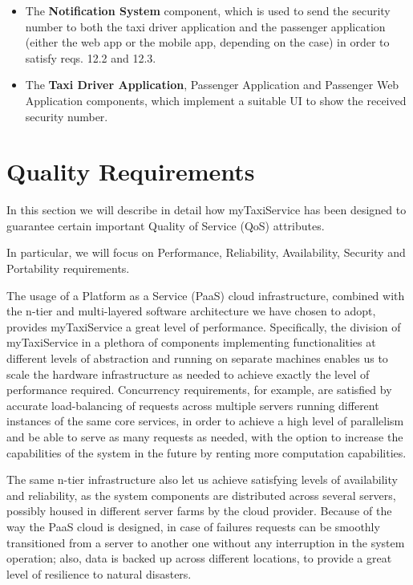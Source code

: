\begin{itemize}
\begin{itemize}
	\item The \textbf{Notification System} component, which is used to send the security number to both the taxi driver application and the passenger application (either the web app or the mobile app, depending on the case) in order to satisfy reqs. 12.2 and 12.3.
	\item The \textbf{Taxi Driver Application}, {Passenger Application} and {Passenger Web Application} components, which implement a suitable UI to show the received security number.
	\end{itemize}
	\end{itemize}

\section{Quality Requirements}

In this section we will describe in detail how myTaxiService has been designed to guarantee certain important Quality of Service (QoS) attributes.

In particular, we will focus on Performance, Reliability, Availability, Security and Portability requirements.

The usage of a Platform as a Service (PaaS) cloud infrastructure, combined with the n-tier and multi-layered software architecture we have chosen to adopt, provides myTaxiService a great level of performance. Specifically, the division of myTaxiService in a plethora of components implementing functionalities at different levels of abstraction and running on separate machines enables us to scale the hardware infrastructure as needed to achieve exactly the level of performance required. Concurrency requirements, for example, are satisfied by accurate load-balancing of requests across multiple servers running different instances of the same core services, in order to achieve a high level of parallelism and be able to serve as many requests as needed, with the option to increase the capabilities of the system in the future by renting more computation capabilities. 

The same n-tier infrastructure also let us achieve satisfying levels of availability and reliability, as the system components are distributed across several servers, possibly housed in different server farms by the cloud provider. Because of the way the PaaS cloud is designed, in case of failures requests can be smoothly transitioned from a server to another one without any interruption in the system operation; also, data is backed up across different locations, to provide a great level of resilience to natural disasters.

